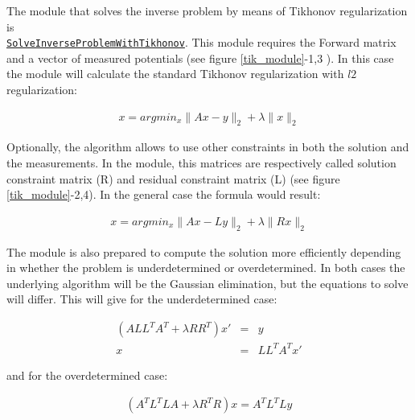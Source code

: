 \documentclass[fleqn,11pt,openany]{book}
\begin{document}
The module that solves the inverse problem by means of Tikhonov regularization is\\
\href{http://scirundocwiki.sci.utah.edu/SCIRunDocs/index.php/CIBC:Documentation:SCIRun:Reference:BioPSE:SolveInverseProblemWithTikhonov}{{\tt SolveInverseProblemWithTikhonov}}.
This module requires the Forward matrix and a vector of measured potentials (see figure \ref{tik_module}-1,3 ). In this case the module will calculate the standard Tikhonov regularization with $l2$ regularization:
\begin{center}
 \begin{eqnarray}
  x = argmin_x \|Ax -y\|_2 + \lambda \|x\|_2
 \end{eqnarray}
\end{center}

Optionally, the algorithm allows to use other constraints in both the solution and the measurements. In the module, this matrices are respectively called solution constraint 
matrix (R) and residual constraint matrix (L) (see figure \ref{tik_module}-2,4). In the general case the formula would result:
\begin{center}
 \begin{eqnarray}
  x = argmin_x \|Ax -Ly\|_2 + \lambda \|Rx\|_2
 \end{eqnarray}
\end{center}

The module is also prepared to compute the solution more efficiently depending in whether the problem is underdetermined or overdetermined. In both cases the underlying 
algorithm will be the Gaussian elimination, but the equations to solve will differ. This will give for the underdetermined case:
\begin{center}
 \begin{eqnarray}
  (ALL^TA^T + \lambda RR^T)x' &=& y\\
  x &=& LL^TA^Tx'
  \label{tik_problem_underdet_invop}
 \end{eqnarray}
\end{center}
\noindent and for the overdetermined case:
\begin{center}
 \begin{eqnarray}
  (A^TL^TLA + \lambda R^TR)x = A^TL^TLy 
  \label{tik_problem_overdet_invop}
 \end{eqnarray}
\end{center}
\end{document}
